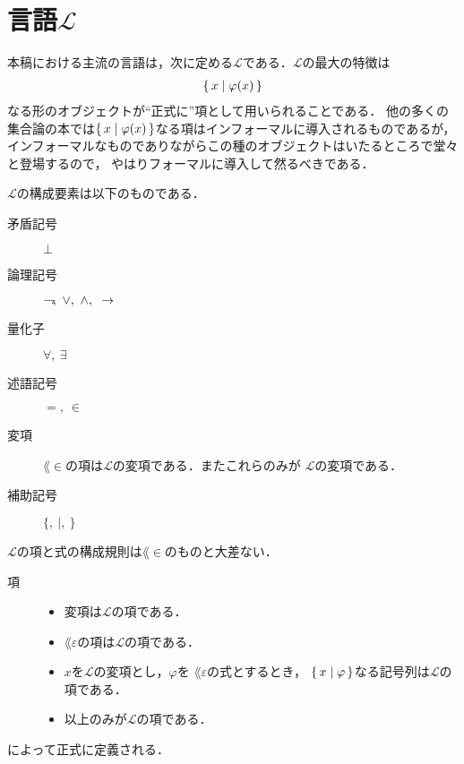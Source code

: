 \section{言語$\mathcal{L}$}
	本稿における主流の言語は，次に定める$\mathcal{L}$である．$\mathcal{L}$の最大の特徴は
	\begin{align}
		\left\{\, x \mid \varphi(x)\, \right\}
	\end{align}
	なる形のオブジェクトが``正式に''項として用いられることである．
	他の多くの集合論の本では$\left\{\, x \mid \varphi(x)\, \right\}$なる項はインフォーマルに導入されるものであるが，
	インフォーマルなものでありながらこの種のオブジェクトはいたるところで堂々と登場するので，
	やはりフォーマルに導入して然るべきである．
	
	$\mathcal{L}$の構成要素は以下のものである．
	
	\begin{description}
		\item[矛盾記号] $\bot$
		\item[論理記号] $\negation,\ \vee,\ \wedge,\ \rarrow$
		\item[量化子] $\forall,\ \exists$
		\item[述語記号] $=,\ \in$
		\item[変項] $\lang{\in}$の項は$\mathcal{L}$の変項である．またこれらのみが
			$\mathcal{L}$の変項である．
		\item[補助記号] $\{,\ |,\ \}$
	\end{description}
	
	$\mathcal{L}$の項と式の構成規則は$\lang{\in}$のものと大差ない．
	
	\begin{description}
		\item[項] 
			\begin{itemize}
				\item 変項は$\mathcal{L}$の項である．
				\item $\lang{\varepsilon}$の項は$\mathcal{L}$の項である．
				\item $x$を$\mathcal{L}$の変項とし，$\varphi$を
					$\lang{\varepsilon}$の式とするとき，
					$\left\{\, x \mid \varphi\, \right\}$なる記号列は$\mathcal{L}$の項である．
				\item 以上のみが$\mathcal{L}$の項である．
			\end{itemize}
	\end{description}
	
	によって正式に定義される．
	
